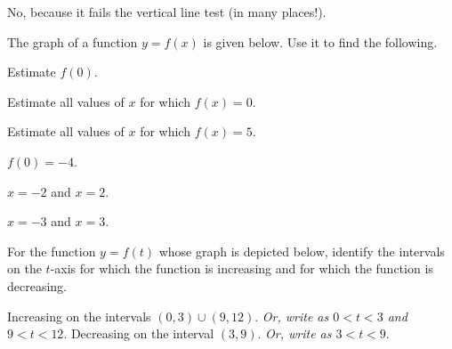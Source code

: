 \begin{solution}
No, because it fails the vertical line test (in many places!).
\end{solution}



\begin{exercise}
The graph of a function $y=f(x)$ is given below. Use it to find the following.


\begin{center}
\end{center}


\begin{parts}
\item Estimate $f(0)$.

\item Estimate all values of $x$ for which $f(x)=0$.

\item Estimate all values of $x$ for which $f(x)=5$.
\end{parts}
\end{exercise}

\begin{solution}
\begin{parts}
\item $f(0) = -4$.
\item $x=-2$ and $x=2$.
\item $x=-3$ and $x = 3$.
\end{parts}
\end{solution}



\begin{exercise}
For the function $y=f(t)$ whose graph is depicted below, identify the intervals on the $t$-axis for which the function is increasing and for which the function is decreasing.


\begin{center}
\end{center}

\end{exercise}

\begin{solution}
Increasing on the intervals $(0,3) \cup (9,12)$. {\it Or, write as $0<t<3$ and $9<t<12$}.
Decreasing on the interval $(3,9)$. {\it Or, write as $3<t<9$}.
\end{solution}